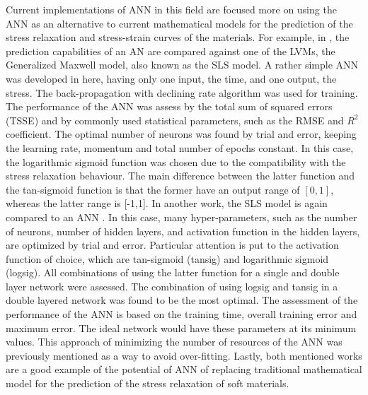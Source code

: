 Current implementations of ANN in this field are focused more on using the ANN as an alternative to current mathematical models for the prediction of the stress relaxation and stress-strain curves of the materials. For example, in \cite{saeidirad2013predictions} , the prediction capabilities of an AN are compared against one of the LVMs, the Generalized Maxwell model, also known as the SLS model. A rather simple ANN was developed in here, having only one input, the time, and one output, the stress. The back-propagation with declining rate algorithm was used for training. The performance of the ANN was assess by the total sum of squared errors (TSSE) and by commonly used statistical parameters, such as the RMSE and $R^2$ coefficient. The optimal number of neurons was found by trial and error, keeping the learning rate, momentum and total number of epochs constant. In this case, the logarithmic sigmoid function was chosen due to the compatibility with the stress relaxation behaviour. The main difference between the latter function and the tan-sigmoid function is that the former have an output range of $[0,1]$, whereas the latter range is [-1,1]. In another work, the SLS model is again compared to an ANN \cite{gao2015viscoelastic}. In this case, many hyper-parameters, such as the number of neurons, number of hidden layers, and activation function in the hidden layers, are optimized by trial and error. Particular attention is put to the activation function of choice, which are tan-sigmoid (tansig) and logarithmic sigmoid (logsig). All combinations of using the latter function for a single and double layer network were assessed. The combination of using logsig and tansig in a double layered network was found to be the most optimal. The assessment of the performance of the ANN is based on the training time, overall training error and maximum error. The ideal network would have these parameters at its minimum values. This approach of minimizing the number of resources of the ANN was previously mentioned as a way to avoid over-fitting. Lastly, both mentioned works are a good example of the potential of ANN of replacing traditional mathematical model for the prediction of the stress relaxation of soft materials.

